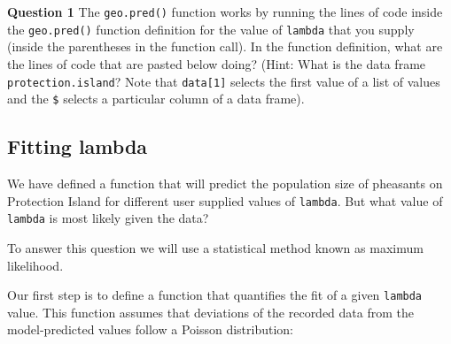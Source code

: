 \documentclass[
]{book}
\newenvironment{Shaded}{\begin{snugshade}}{\end{snugshade}}
\newcommand{\AttributeTok}[1]{\textcolor[rgb]{0.77,0.63,0.00}{#1}}
\newcommand{\ControlFlowTok}[1]{\textcolor[rgb]{0.13,0.29,0.53}{\textbf{#1}}}
\newcommand{\DecValTok}[1]{\textcolor[rgb]{0.00,0.00,0.81}{#1}}
\newcommand{\FunctionTok}[1]{\textcolor[rgb]{0.00,0.00,0.00}{#1}}
\newcommand{\NormalTok}[1]{#1}
\newcommand{\OtherTok}[1]{\textcolor[rgb]{0.56,0.35,0.01}{#1}}
\newcommand{\SpecialCharTok}[1]{\textcolor[rgb]{0.00,0.00,0.00}{#1}}
\begin{document}
\textbf{Question 1} The \texttt{geo.pred()} function works by running the lines of code inside the \texttt{geo.pred()} function definition for the value of \texttt{lambda} that you supply (inside the parentheses in the function call). In the function definition, what are the lines of code that are pasted below doing? (Hint: What is the data frame \texttt{protection.island}? Note that \texttt{data{[}1{]}} selects the first value of a list of values and the \texttt{\$} selects a particular column of a data frame).

\begin{Shaded}
\end{Shaded}

\hypertarget{fitting-lambda}{%
\subsection{Fitting lambda}\label{fitting-lambda}}

We have defined a function that will predict the population size of pheasants on Protection Island for different user supplied values of \texttt{lambda}. But what value of \texttt{lambda} is most likely given the data?

To answer this question we will use a statistical method known as maximum likelihood.

Our first step is to define a function that quantifies the fit of a given \texttt{lambda} value. This function assumes that deviations of the recorded data from the model-predicted values follow a Poisson distribution:

\begin{Shaded}
\end{Shaded}
\end{document}
